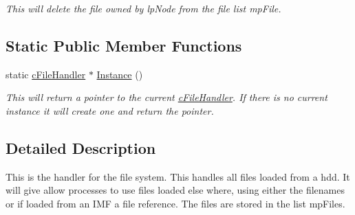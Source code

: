 \begin{DoxyCompactItemize}
\begin{DoxyCompactList}\small\item\em This will delete the file owned by lpNode from the file list mpFile. \end{DoxyCompactList}\end{DoxyCompactItemize}
\subsection*{Static Public Member Functions}
\begin{DoxyCompactItemize}
\item 
\hypertarget{classc_file_handler_a03de3fbc79a44ef92ca36373743a92fd}{
static \hyperlink{classc_file_handler}{cFileHandler} $\ast$ \hyperlink{classc_file_handler_a03de3fbc79a44ef92ca36373743a92fd}{Instance} ()}
\label{classc_file_handler_a03de3fbc79a44ef92ca36373743a92fd}

\begin{DoxyCompactList}\small\item\em This will return a pointer to the current \hyperlink{classc_file_handler}{cFileHandler}. If there is no current instance it will create one and return the pointer. \end{DoxyCompactList}\end{DoxyCompactItemize}


\subsection{Detailed Description}
This is the handler for the file system. This handles all files loaded from a hdd. It will give allow processes to use files loaded else where, using either the filenames or if loaded from an IMF a file reference. The files are stored in the list mpFiles. 